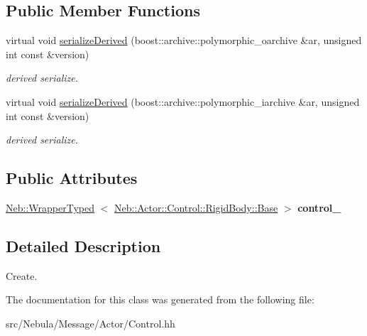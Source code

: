 \subsection*{\-Public \-Member \-Functions}
\begin{DoxyCompactItemize}
\item 
\hypertarget{classNeb_1_1Message_1_1Actor_1_1Control_1_1RigidBody_1_1Create_acbf4c5b3ac614c8d23c24eebd5c0c262}{virtual void \hyperlink{classNeb_1_1Message_1_1Actor_1_1Control_1_1RigidBody_1_1Create_acbf4c5b3ac614c8d23c24eebd5c0c262}{serialize\-Derived} (boost\-::archive\-::polymorphic\-\_\-oarchive \&ar, unsigned int const \&version)}\label{classNeb_1_1Message_1_1Actor_1_1Control_1_1RigidBody_1_1Create_acbf4c5b3ac614c8d23c24eebd5c0c262}

\begin{DoxyCompactList}\small\item\em derived serialize. \end{DoxyCompactList}\item 
\hypertarget{classNeb_1_1Message_1_1Actor_1_1Control_1_1RigidBody_1_1Create_a605672877b5e29fa8a4b400de203e83f}{virtual void \hyperlink{classNeb_1_1Message_1_1Actor_1_1Control_1_1RigidBody_1_1Create_a605672877b5e29fa8a4b400de203e83f}{serialize\-Derived} (boost\-::archive\-::polymorphic\-\_\-iarchive \&ar, unsigned int const \&version)}\label{classNeb_1_1Message_1_1Actor_1_1Control_1_1RigidBody_1_1Create_a605672877b5e29fa8a4b400de203e83f}

\begin{DoxyCompactList}\small\item\em derived serialize. \end{DoxyCompactList}\end{DoxyCompactItemize}
\subsection*{\-Public \-Attributes}
\begin{DoxyCompactItemize}
\item 
\hypertarget{classNeb_1_1Message_1_1Actor_1_1Control_1_1RigidBody_1_1Create_ad5dad4e62045e21146c253792c0c36ee}{\hyperlink{classNeb_1_1WrapperTyped}{\-Neb\-::\-Wrapper\-Typed}\*
$<$ \hyperlink{classNeb_1_1Actor_1_1Control_1_1RigidBody_1_1Base}{\-Neb\-::\-Actor\-::\-Control\-::\-Rigid\-Body\-::\-Base} $>$ {\bfseries control\-\_\-}}\label{classNeb_1_1Message_1_1Actor_1_1Control_1_1RigidBody_1_1Create_ad5dad4e62045e21146c253792c0c36ee}

\end{DoxyCompactItemize}


\subsection{\-Detailed \-Description}
\-Create. 

\-The documentation for this class was generated from the following file\-:\begin{DoxyCompactItemize}
\item 
src/\-Nebula/\-Message/\-Actor/\-Control.\-hh\end{DoxyCompactItemize}

